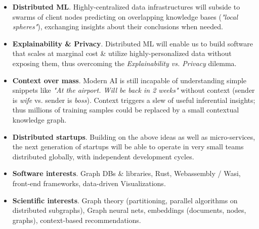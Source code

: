 \documentclass[a4paper]{twentysecondcv} %
\begin{document}
\begin{itemize}	
	\item \textbf{Distributed ML}. Highly-centralized data infrastructures will subside to swarms of client nodes predicting on overlapping knowledge bases (\emph{"local spheres"}), exchanging insights about their conclusions when needed.
	
	\item \textbf{Explainability \& Privacy}. Distributed ML will enable us to build software that scales at marginal cost \& utilize highly-personalized data without exposing them, thus overcoming the \textit{Explainability vs. Privacy} dilemma.
	
	\item \textbf{Context over mass}. Modern AI is still incapable of understanding simple snippets like \emph{"At the airport. Will be back in 2 weeks"} without context (sender is \emph{wife} vs. sender is \emph{boss}). Context triggers a slew of useful inferential insights; thus millions of training samples could be replaced by a small contextual knowledge graph.
	
	\item \textbf{Distributed startups}. Building on the above ideas as well as micro-services, the next generation of startups will be able to operate in very small teams distributed globally, with independent development cycles.
	
	\item \textbf{Software interests}. Graph DBs \& libraries, Rust, Webassembly / Wasi, front-end frameworks, data-driven Visualizations.
	
	\item \textbf{Scientific interests}. Graph theory (partitioning, parallel algorithms on distributed subgraphs), Graph neural nets, embeddings (documents, nodes, graphs), context-based recommendations.
	
\end{itemize}



\end{document}

